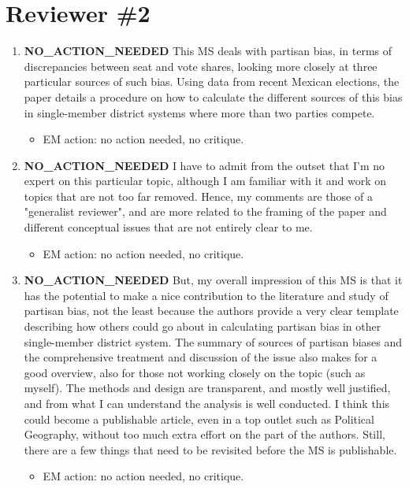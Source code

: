 \documentclass{article}
\begin{document}
\section{Reviewer \#2}
\label{sec:orgheadline16}
\begin{enumerate}
\item {\bfseries\sffamily NO\_ACTION\_NEEDED} This MS deals with partisan bias, in terms of discrepancies between seat and vote shares, looking more closely at three particular sources of such bias. Using data from recent Mexican elections, the paper details a procedure on how to calculate the different sources of this bias in single-member district systems where more than two parties compete.
\label{sec:orgheadline3}
\begin{itemize}
\item EM action: no action needed, no critique.
\end{itemize}

\item {\bfseries\sffamily NO\_ACTION\_NEEDED} I have to admit from the outset that I'm no expert on this particular topic, although I am familiar with it and work on topics that are not too far removed. Hence, my comments are those of a "generalist reviewer", and are more related to the framing of the paper and different conceptual issues that are not entirely clear to me.
\label{sec:orgheadline4}
\begin{itemize}
\item EM action: no action needed, no critique.
\end{itemize}

\item {\bfseries\sffamily NO\_ACTION\_NEEDED} But, my overall impression of this MS is that it has the potential to make a nice contribution to the literature and study of partisan bias, not the least because the authors provide a very clear template describing how others could go about in calculating partisan bias in other single-member district system. The summary of sources of partisan biases and the comprehensive treatment and discussion of the issue also makes for a good overview, also for those not working closely on the topic (such as myself). The methods and design are transparent, and mostly well justified, and from what I can understand the analysis is well conducted. I think this could become a publishable article, even in a top outlet such as Political Geography, without too much extra effort on the part of the authors. Still, there are a few things that need to be revisited before the MS is publishable.
\label{sec:orgheadline5}
\begin{itemize}
\item EM action: no action needed, no critique.
\end{itemize}


\end{enumerate}
\end{document}
